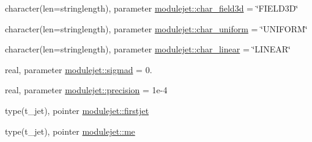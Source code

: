 \begin{DoxyCompactItemize}
\item 
character(len=stringlength), parameter \mbox{\hyperlink{namespacemodulejet_ab29798d11a7038ce6bed995f6906602b}{modulejet\+::char\+\_\+field3d}} = \char`\"{}F\+I\+E\+L\+D3D\char`\"{}
\item 
character(len=stringlength), parameter \mbox{\hyperlink{namespacemodulejet_a712a0fb09e3bed71ec54b3f527cf6620}{modulejet\+::char\+\_\+uniform}} = \char`\"{}U\+N\+I\+F\+O\+RM\char`\"{}
\item 
character(len=stringlength), parameter \mbox{\hyperlink{namespacemodulejet_a8e1524ba4bcb2d9dc829cb15187def34}{modulejet\+::char\+\_\+linear}} = \char`\"{}L\+I\+N\+E\+AR\char`\"{}
\item 
real, parameter \mbox{\hyperlink{namespacemodulejet_a0d016ad4bb2860942a6dee0743ceb113}{modulejet\+::sigmad}} = 0.
\item 
real, parameter \mbox{\hyperlink{namespacemodulejet_a1e044c780afebf2d2dbf72987f29c21c}{modulejet\+::precision}} = 1e-\/4
\item 
type(t\+\_\+jet), pointer \mbox{\hyperlink{namespacemodulejet_a71f07968cb9db6433b4bf6e542b64236}{modulejet\+::firstjet}}
\item 
type(t\+\_\+jet), pointer \mbox{\hyperlink{namespacemodulejet_ab55c2a250d5e25c16efdfeea48d0b3da}{modulejet\+::me}}
\end{DoxyCompactItemize}
